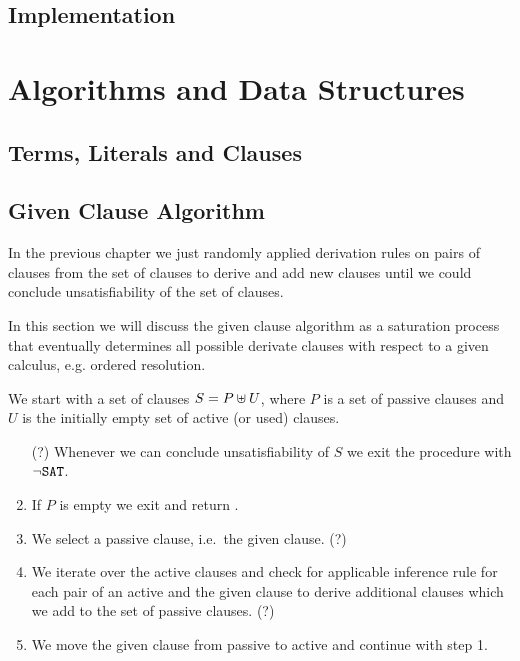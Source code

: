 
\section{Implementation}

\chapter{Algorithms and Data Structures}

\section{Terms, Literals and Clauses}




\section{Given Clause Algorithm}

In the previous chapter we just randomly applied derivation rules
on pairs of clauses from the set of clauses 
to derive and add new clauses 
until we could conclude unsatisfiability of the set of clauses.

In this section we will discuss the given clause algorithm 
as a saturation process that eventually determines all possible derivate clauses
with respect to a given calculus, e.g. ordered resolution.




\begin{procedure}
	We start with a set of clauses $S = P \uplus U$, 
	where $P$ is a set of {\myem passive} clauses 
	and $U$ is the initially empty set of {\myem active} (or used) clauses.
	\begin{enumerate}
		\item[(\Lightning?)] Whenever we can conclude unsatisfiability of $S$ 
		we exit the procedure with $\lnot\texttt{SAT}$.
		\setcounter{enumi}{0}
		\item If $P$ is empty we exit and return \SAT.
		\item We select a passive clause, i.e.~the given clause. (\Lightning?)
		\item We iterate over the active clauses and check for applicable inference rule
		for each pair of an active and the given clause
		to derive additional clauses which we add to the set of passive clauses.
		(\Lightning?)
		\item We move the given clause from passive to active and continue with step 1.
	\end{enumerate}
\end{procedure}


